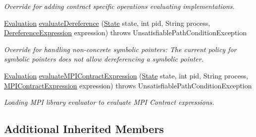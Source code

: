 \begin{DoxyCompactItemize}
\begin{DoxyCompactList}\small\item\em Override for adding contract specific operations evaluating implementations. \end{DoxyCompactList}\item 
\hypertarget{classedu_1_1udel_1_1cis_1_1vsl_1_1civl_1_1semantics_1_1contract_1_1ContractEvaluator_ac6b7365276e9c4ca4e8fcd6f32435f97}{}\hyperlink{classedu_1_1udel_1_1cis_1_1vsl_1_1civl_1_1semantics_1_1IF_1_1Evaluation}{Evaluation} \hyperlink{classedu_1_1udel_1_1cis_1_1vsl_1_1civl_1_1semantics_1_1contract_1_1ContractEvaluator_ac6b7365276e9c4ca4e8fcd6f32435f97}{evaluate\+Dereference} (\hyperlink{interfaceedu_1_1udel_1_1cis_1_1vsl_1_1civl_1_1state_1_1IF_1_1State}{State} state, int pid, String process, \hyperlink{interfaceedu_1_1udel_1_1cis_1_1vsl_1_1civl_1_1model_1_1IF_1_1expression_1_1DereferenceExpression}{Dereference\+Expression} expression)  throws Unsatisfiable\+Path\+Condition\+Exception \label{classedu_1_1udel_1_1cis_1_1vsl_1_1civl_1_1semantics_1_1contract_1_1ContractEvaluator_ac6b7365276e9c4ca4e8fcd6f32435f97}

\begin{DoxyCompactList}\small\item\em Override for handling non-\/concrete symbolic pointers\+: The current policy for symbolic pointers does not allow dereferencing a symbolic pointer. \end{DoxyCompactList}\item 
\hyperlink{classedu_1_1udel_1_1cis_1_1vsl_1_1civl_1_1semantics_1_1IF_1_1Evaluation}{Evaluation} \hyperlink{classedu_1_1udel_1_1cis_1_1vsl_1_1civl_1_1semantics_1_1contract_1_1ContractEvaluator_a0b610055f2a7cfa3dbb49a5f26efa730}{evaluate\+M\+P\+I\+Contract\+Expression} (\hyperlink{interfaceedu_1_1udel_1_1cis_1_1vsl_1_1civl_1_1state_1_1IF_1_1State}{State} state, int pid, String process, \hyperlink{interfaceedu_1_1udel_1_1cis_1_1vsl_1_1civl_1_1model_1_1IF_1_1expression_1_1MPIContractExpression}{M\+P\+I\+Contract\+Expression} expression)  throws Unsatisfiable\+Path\+Condition\+Exception 
\begin{DoxyCompactList}\small\item\em Loading M\+P\+I library evaluator to evaluate M\+P\+I Contract expressions. \end{DoxyCompactList}\end{DoxyCompactItemize}
\subsection*{Additional Inherited Members}


